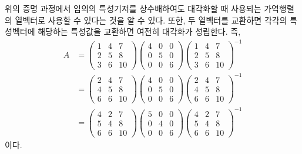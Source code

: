 \documentclass[sections/engineering_mathematics_lecture_note.tex]{subfiles}
\begin{document}
\begin{remark}
    위의 증명 과정에서 임의의 특성기저를 상수배하여도 대각화할 때 사용되는 가역행렬의 열벡터로 사용할 수 있다는 것을 알 수 있다.
    또한, 두 열벡터를 교환하면 각각의 특성벡터에 해당하는 특성값을 교환하면 여전히 대각화가 성립한다.
    즉,
    \begin{align*}
        A &=
        \begin{pmatrix}
            1 & 4 & 7\\
            2 & 5 & 8\\
            3 & 6 & 10
        \end{pmatrix}
        \begin{pmatrix}
            4 & 0 & 0\\
            0 & 5 & 0\\
            0 & 0 & 6
        \end{pmatrix}
        \begin{pmatrix}
            1 & 4 & 7\\
            2 & 5 & 8\\
            3 & 6 & 10
        \end{pmatrix}^{-1}\\
          &=
        \begin{pmatrix}
            2 & 4 & 7\\
            4 & 5 & 8\\
            6 & 6 & 10
        \end{pmatrix}
        \begin{pmatrix}
            4 & 0 & 0\\
            0 & 5 & 0\\
            0 & 0 & 6
        \end{pmatrix}
        \begin{pmatrix}
            2 & 4 & 7\\
            4 & 5 & 8\\
            6 & 6 & 10
        \end{pmatrix}^{-1}\\
          &=
        \begin{pmatrix}
            4 & 2 & 7\\
            5 & 4 & 8\\
            6 & 6 & 10
        \end{pmatrix}
        \begin{pmatrix}
            5 & 0 & 0\\
            0 & 4 & 0\\
            0 & 0 & 6
        \end{pmatrix}
        \begin{pmatrix}
            4 & 2 & 7\\
            5 & 4 & 8\\
            6 & 6 & 10
        \end{pmatrix}^{-1}
    \end{align*}
    이다.
\end{remark}
\end{document}
